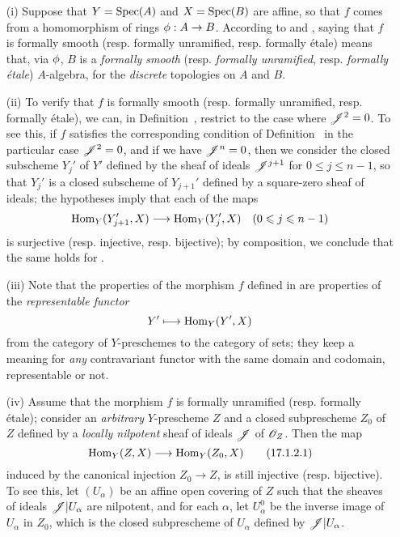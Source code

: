 \begin{remark}[17.1.2]
\label{IV.17.1.2}
\medskip\noindent
\begin{enumerate}
  \item[(i)] Suppose that $Y=\operatorname{Spec}(A)$ and $X=\operatorname{Spec}(B)$ are affine, so that $f$ comes from a homomorphism of rings $\vphi:A\to B$. 
    According to  and , saying that $f$ is formally smooth (resp. formally unramified, resp. formally \'etale) means that, via $\phi$, $B$ is a \emph{formally smooth} (resp. \emph{formally unramified}, resp. \emph{formally \'etale}) $A$-algebra, for the \emph{discrete} topologies on $A$ and $B$.
  \item[(ii)] To verify that $f$ is formally smooth (resp. formally unramified, resp. formally \'etale), we can, in Definition~, restrict to the case where $\mathscr{J}^2=0$.
  To see this, if $f$ satisfies the corresponding condition of Definition~ in the particular case $\mathscr{J}^2=0$, and if we have $\mathscr{J}^n=0$, then we consider the closed subscheme $Y_j'$ of $Y'$ defined by the sheaf of ideals $\mathscr{J}^{j+1}$ for $0\leq j\leq n-1$, so that $Y_j'$ is a closed subscheme of $Y_{j+1}'$ defined by a square-zero sheaf of ideals;
the hypotheses imply that each of the maps
\[
  \Hom_Y(Y_{j+1}',X)\to\Hom_Y(Y_j',X)\quad(0\leq j\leq n-1) 
\]
is surjective (resp. injective, resp. bijective);
by composition, we conclude that the same holds for .
\item[(iii)] Note that the properties of the morphism $f$ defined in  are properties of the \emph{representable functor} 
\[
  Y'\mapsto\Hom_Y(Y',X) 
\]
from the category of $Y$-preschemes to the category of sets;
they keep a meaning for \emph{any} contravariant functor with the same domain and codomain, representable or not.
\item[(iv)] Assume that the morphism $f$ is formally unramified (resp. formally \'etale);
consider an \emph{arbitrary} $Y$-prescheme $Z$ and a closed subprescheme $Z_0$ of $Z$ defined by a \emph{locally nilpotent} sheaf of ideals $\mathscr{J}$ of $\mathscr{O}_Z$. 
Then the map
\[
\label{IV.17.1.2.1}  
  \Hom_Y(Z,X)\to\Hom_Y(Z_0,X)
  \tag{17.1.2.1}
\]
induced by the canonical injection $Z_0\to Z$, is still injective (resp. bijective).
To see this, let $(U_\alpha)$ be an affine open covering of $Z$ such that the sheaves of ideals $\mathscr{J}|U_\alpha$ are nilpotent, and for each $\alpha$, let $U_\alpha^0$ be the inverse image of $U_\alpha$ in $Z_0$, which is the closed subprescheme of $U_\alpha$ defined by $\mathscr{J}|U_\alpha$.

\end{enumerate}
\end{remark}

